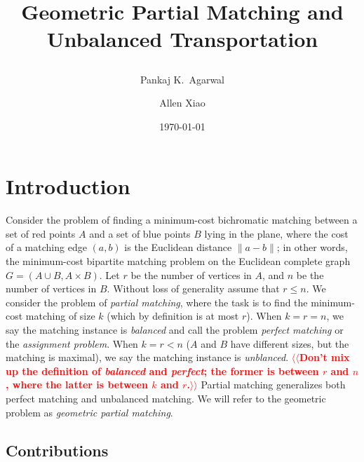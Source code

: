 \documentclass[11pt]{article}
\title{ Geometric Partial Matching and Unbalanced Transportation %
\date{\today} %
\author{
Pankaj K.\ Agarwal
\and
Allen Xiao
}
}
\makeatletter
\theoremstyle{plain}
\def\n@te#1{\textsf{\boldmath \textbf{$\langle\!\langle$#1$\rangle\!\rangle$}}\leavevmode}
\def\note#1{\textcolor{red}{\n@te{#1}}}
\makeatother
\begin{document}
\maketitle

\section{Introduction}

Consider the problem of finding a minimum-cost bichromatic matching between
a set of red points $A$ and a set of blue points $B$ lying in the plane,
where the cost of a matching edge $(a, b)$ is the Euclidean distance
$\|a - b\|$;
in other words, the minimum-cost bipartite matching problem on the Euclidean
complete graph $G = (A \cup B, A \times B)$.
Let $r$ be the number of vertices in $A$, and $n$ be the number of vertices in $B$.
Without loss of generality assume that $r \leq n$.
We consider the problem of \emph{partial matching}, where the task is to
find the minimum-cost matching of size $k$ (which by definition is at most $r$).
When $k = r = n$, we say the matching instance is \emph{balanced}
and call the problem \emph{perfect matching} or the \emph{assignment problem}.
When $k = r < n$ ($A$ and $B$ have different sizes, but the matching is
maximal), we say the matching instance is \emph{unblanced}.
\note{Don't mix up the definition of \emph{balanced} and \emph{perfect}; the former is between $r$ and $n$, where the latter is between $k$ and $r$.}
Partial matching generalizes both perfect matching and unbalanced matching.
We will refer to the geometric problem as \emph{geometric partial matching}.



\subsection{Contributions}
\end{document}
